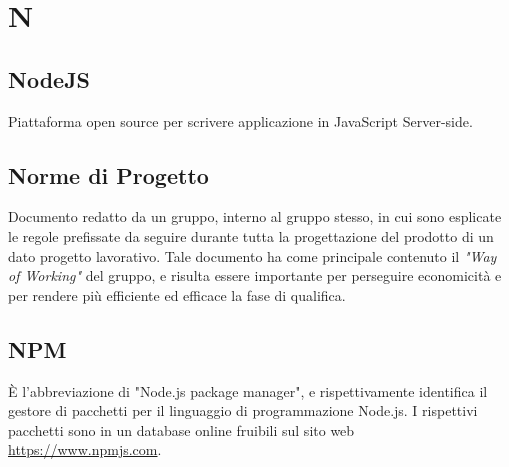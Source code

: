 \section*{N}

\subsection{NodeJS}
Piattaforma open source per scrivere applicazione in JavaScript Server-side.

\subsection{Norme di Progetto}
Documento redatto da un gruppo, interno al gruppo stesso, in cui sono esplicate le regole prefissate da seguire durante tutta la progettazione del prodotto di un dato progetto lavorativo. Tale documento ha come principale contenuto il \textit{"Way of Working"} del gruppo, e risulta essere importante per perseguire economicità e per rendere più efficiente ed efficace la fase di qualifica.

\subsection{NPM}
È l'abbreviazione di "Node.js package manager", e rispettivamente identifica il gestore di pacchetti per il linguaggio di programmazione Node.js. I rispettivi pacchetti sono in un database online fruibili sul sito web \url{https://www.npmjs.com}.
